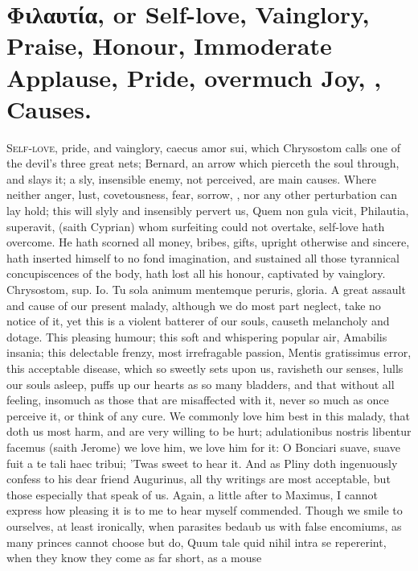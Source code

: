 {\section[Φιλαυτία, or Self-love]{Φιλαυτία, or Self-love, Vainglory, Praise, Honour, Immoderate Applause, Pride, overmuch Joy, \etc{}, Causes.}
\lettrine{S}{elf-love}, pride, and vainglory, caecus amor sui, which
Chrysostom calls one of the devil's three great nets; Bernard, an
arrow which pierceth the soul through, and slays it; a sly, insensible
enemy, not perceived, are main causes. Where neither anger, lust,
covetousness, fear, sorrow, \etc{}, nor any other perturbation can lay
hold; this will slyly and insensibly pervert us, Quem non gula vicit,
Philautia, superavit, (saith Cyprian) whom surfeiting could not
overtake, self-love hath overcome. He hath scorned all money,
bribes, gifts, upright otherwise and sincere, hath inserted himself to
no fond imagination, and sustained all those tyrannical concupiscences
of the body, hath lost all his honour, captivated by vainglory.
Chrysostom, sup. Io. Tu sola animum mentemque peruris, gloria. A great
assault and cause of our present malady, although we do most part
neglect, take no notice of it, yet this is a violent batterer of our
souls, causeth melancholy and dotage. This pleasing humour; this soft
and whispering popular air, Amabilis insania; this delectable frenzy,
most irrefragable passion, Mentis gratissimus error, this acceptable
disease, which so sweetly sets upon us, ravisheth our senses, lulls our
souls asleep, puffs up our hearts as so many bladders, and that without
all feeling, insomuch as those that are misaffected with it,
never so much as once perceive it, or think of any cure. We commonly
love him best in this malady, that doth us most harm, and are
very willing to be hurt; adulationibus nostris libentur facemus (saith
 Jerome) we love him, we love him for it: O Bonciari suave,
suave fuit a te tali haec tribui; 'Twas sweet to hear it. And as
Pliny doth ingenuously confess to his dear friend Augurinus, all
thy writings are most acceptable, but those especially that speak of
us. Again, a little after to Maximus, I cannot express how
pleasing it is to me to hear myself commended. Though we smile to
ourselves, at least ironically, when parasites bedaub us with false
encomiums, as many princes cannot choose but do, Quum tale quid nihil
intra se repererint, when they know they come as far short, as a mouse
}
